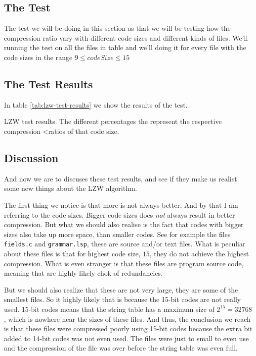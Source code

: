\begin{refsection}
\subsection{The Test}

The test we will be doing in this section as that we will be testing
how the compression ratio vary with different code sizes and different
kinds of files. We'll running the test on all the files in table and
we'll doing it for every file with the code sizes in the range $9 \leq
codeSize \leq 15$

\subsection{The Test Results}

In table \ref{tab:lzw-test-results} we show the results of the test.

\begin{table}
  \scriptsize
  \centering
  
  \caption{LZW test results. The different percentages the represent the respective compression <ratios of that code size.}
  \label{tab:lzw-test-results}
\end{table}

\subsection{Discussion}

And now we are to discuses these test results, and see if they make us
realist some new things about the LZW algorithm.

The first thing we notice is that more is not always better. And by
that I am referring to the code sizes. Bigger code sizes does
\textit{not} always result in better compression. But what we should
also realise is the fact that codes with bigger sizes also take up
more space, than smaller codes. See for example the files
\verb|fields.c| and \verb|grammar.lsp|, these are source and/or text
files. What is peculiar about these files is that for highest code
size, $15$, they do not achieve the highest compression. What is even
stranger is that these files are program source code, meaning that are
highly likely chok of redundancies.

But we should also realize that these are not very large, they are
some of the smallest files. So it highly likely that is because the
15-bit codes are not really used. 15-bit codes means that the string
table has a maximum size of $2^{15} = 32768$, which is nowhere near
the sizes of these files. And thus, the conclusion we reach is that
these files were compressed poorly using 15-bit codes because the
extra bit added to 14-bit codes was not even used. The files were just
to small to even use and the compression of the file was over before
the string table was even full.


\end{refsection}
